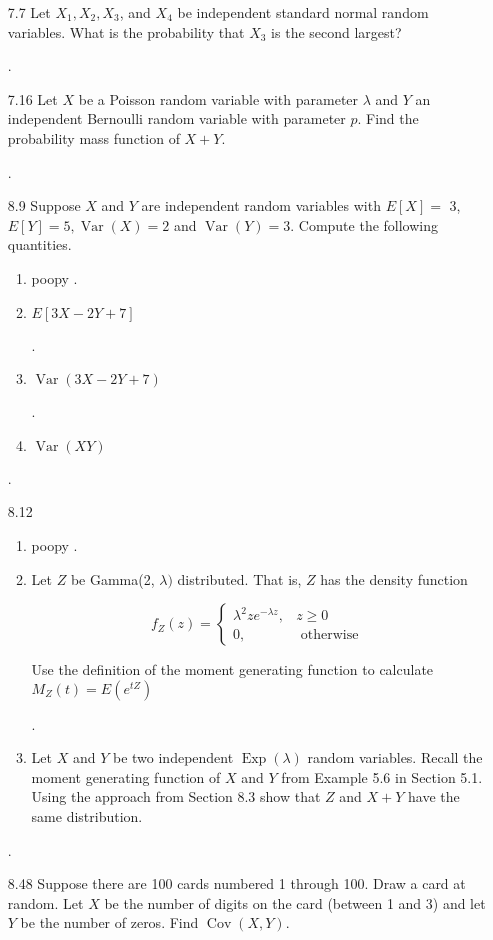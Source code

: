 \documentclass[10pt]{article}
\begin{document}
\begin{itemize}
\newpage
 . \item[7.7] Let $X_{1}, X_{2}, X_{3}$, and $X_{4}$ be independent standard normal random variables. What is the probability that $X_{3}$ is the second largest?

\newpage
 . \item[7.16] Let $X$ be a Poisson random variable with parameter $\lambda$ and $Y$ an independent Bernoulli random variable with parameter $p$. Find the probability mass function of $X+Y$.


\newpage
 . \item[8.9] Suppose $X$ and $Y$ are independent random variables with $E[X]=$ 3, $E[Y]=5, \operatorname{Var}(X)=2$ and $\operatorname{Var}(Y)=3$. Compute the following quantities.

    \begin{enumerate}
 .    .   \item poopy
 .     \item $E[3 X-2 Y+7]$

 .     \item $\operatorname{Var}(3 X-2 Y+7)$

 .     \item $\operatorname{Var}(X Y)$
    \end{enumerate}

\newpage
 . \item[8.12]

     \begin{enumerate}
 .    .    \item poopy
 .     \item Let $Z$ be Gamma(2, $\lambda)$ distributed. That is, $Z$ has the density function

$$
f_{Z}(z)= \begin{cases}\lambda^{2} z e^{-\lambda z}, & z \geq 0 \\ 0, & \text { otherwise }\end{cases}
$$

Use the definition of the moment generating function to calculate $M_{Z}(t)=E\left(e^{t Z}\right)$

 .     \item Let $X$ and $Y$ be two independent $\operatorname{Exp}(\lambda)$ random variables. Recall the moment generating function of $X$ and $Y$ from Example 5.6 in Section 5.1. Using the approach from Section 8.3 show that $Z$ and $X+Y$ have the same distribution.
     \end{enumerate}


\newpage
 . \item[8.48] Suppose there are 100 cards numbered 1 through 100. Draw a card at random. Let $X$ be the number of digits on the card (between 1 and 3) and let $Y$ be the number of zeros. Find $\operatorname{Cov}(X, Y)$.


\end{itemize}
\end{document}

